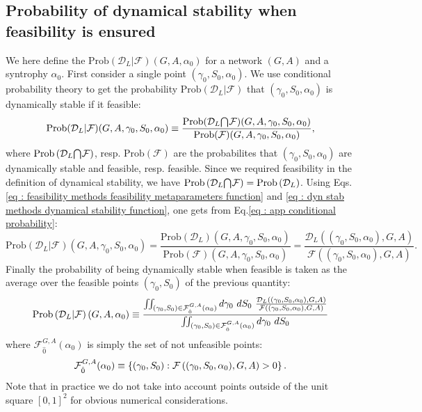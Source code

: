 \documentclass[12pt]{report}
\begin{document}
\subsection{Probability of dynamical stability when feasibility is ensured}\label{app : probability of being dynamically stable when feasible}
We here define the  $\text{Prob}\left(\mathcal{D}_L | \mathcal{F}\right)(G,A, \alpha_0)$ for a network $(G,A)$ and a syntrophy $\alpha_0$. First consider a single point $(\gamma_0, S_0, \alpha_0)$. We use conditional probability theory \cite{kolmogorov_foundations_1960} to get the probability $\text{Prob}(\mathcal{D}_L | \mathcal{F})$ that $(\gamma_0, S_0, \alpha_0)$ is dynamically stable if it feasible:
\begin{equation}
\text{Prob}(\mathcal{D}_L | \mathcal{F})(G, A, \gamma_0, S_0, \alpha_0) \equiv \frac{\text{Prob}(\mathcal{D}_L {\bigcap}_{} \mathcal{F})(G, A, \gamma_0, S_0, \alpha_0)}{\text{Prob}(\mathcal{F})(G, A, \gamma_0, S_0, \alpha_0)}, \label{eq : app conditional probability}
\end{equation}
where $\text{Prob}\left(\mathcal{D}_L {\bigcap}_{} \mathcal{F}\right)$, resp. $\text{Prob}\left(\mathcal{F}\right)$ are the probabilites that $(\gamma_0, S_0, \alpha_0)$ are dynamically stable and feasible, resp. feasible. Since we required feasibility in the definition of dynamical stability, we have $\text{Prob}\left(\mathcal{D}_L {\bigcap}_{} \mathcal{F}\right)=\text{Prob}\left(\mathcal{D}_L\right)$. Using Eqs.\eqref{eq : feasibility methods feasibility metaparameters function} and \eqref{eq : dyn stab methods dynamical stability function}, one gets from Eq.\eqref{eq : app conditional probability}:
\begin{equation}
\text{Prob}(\mathcal{D}_L | \mathcal{F})(G, A, \gamma_0, S_0, \alpha_0) = \frac{\text{Prob}(\mathcal{D}_L)(G, A, \gamma_0, S_0, \alpha_0)}{\text{Prob}(\mathcal{F})(G, A, \gamma_0, S_0, \alpha_0)} = \frac{\mathcal{D}_L\left((\gamma_0, S_0, \alpha_0), G, A\right)}{\mathcal{F}\left((\gamma_0, S_0, \alpha_0), G, A\right)}.
\end{equation}
Finally the probability of being dynamically stable when feasible is taken as the average over the feasible points $(\gamma_0, S_0)$ of the previous quantity:
\begin{equation}
\text{Prob}\left(\mathcal{D}_L | \mathcal{F}\right)(G, A, \alpha_0) \defined \frac{\iint_{(\gamma_0, S_0) \in \mathcal{F}^{G,A}_{\hat{0}}(\alpha_0)}d\gamma_0 \ dS_0 \ \frac{\mathcal{D}_L\left((\gamma_0, S_0, \alpha_0), G, A\right)}{\mathcal{F}\left((\gamma_0, S_0, \alpha_0), G, A\right)}}{\iint_{(\gamma_0, S_0) \in \mathcal{F}^{G,A}_{\hat{0}}(\alpha_0)}d\gamma_0 \ dS_0 }
\end{equation}
where $\mathcal{F}^{G,A}_{\hat{0}}(\alpha_0)$ is simply the set of not unfeasible points:
\begin{equation}
\mathcal{F}^{G,A}_{\hat{0}}(\alpha_0) \equiv \left\{(\gamma_0, S_0) : \mathcal{F}\left((\gamma_0, S_0, \alpha_0), G, A\right) > 0\right\}.
\end{equation}
Note that in practice we do not take into account points outside of the unit square $[0,1]^2$ for obvious numerical considerations.
\end{document}
